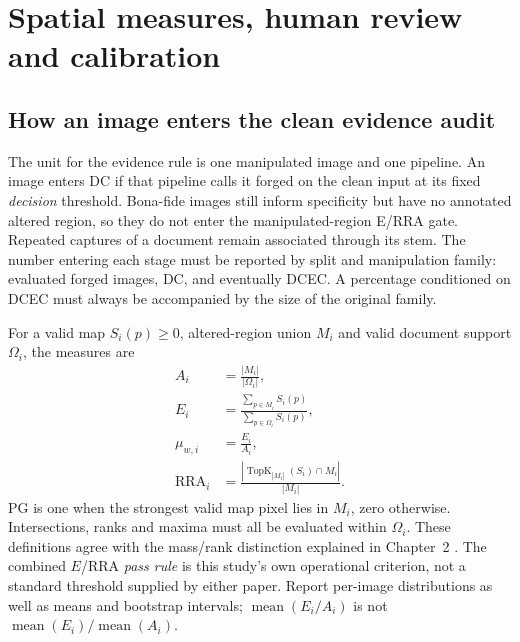 
\chapter{Spatial measures, human review and calibration}
\label{app:clean-metrics}

\section{How an image enters the clean evidence audit}
\label{app:clean-metrics-entry}

The unit for the evidence rule is one manipulated image and one pipeline. An image enters DC if that pipeline calls it forged on the clean input at its fixed \emph{decision} threshold. Bona-fide images still inform specificity but have no annotated altered region, so they do not enter the manipulated-region E/RRA gate. Repeated captures of a document remain associated through its stem. The number entering each stage must be reported by split and manipulation family: evaluated forged images, DC, and eventually DCEC. A percentage conditioned on DCEC must always be accompanied by the size of the original family.

For a valid map $S_i(p)\geq0$, altered-region union $M_i$ and valid document support $\Omega_i$, the measures are
\begin{equation}
\begin{aligned}
A_i&=\frac{|M_i|}{|\Omega_i|},\\
E_i&=\frac{\sum_{p\in M_i}S_i(p)}{\sum_{p\in\Omega_i}S_i(p)},\\
\mu_{w,i}&=\frac{E_i}{A_i},\\
\mathrm{RRA}_i&=\frac{|\operatorname{TopK}_{|M_i|}(S_i)\cap M_i|}{|M_i|}.
\end{aligned}
\label{eq:app-clean-measures}
\end{equation}
PG is one when the strongest valid map pixel lies in $M_i$, zero otherwise. Intersections, ranks and maxima must all be evaluated within $\Omega_i$. These definitions agree with the mass/rank distinction explained in Chapter~2 \citep{arras2022clevrxai,wang2020scorecam}. The combined $E$/RRA \emph{pass rule} is this study's own operational criterion, not a standard threshold supplied by either paper. Report per-image distributions as well as means and bootstrap intervals; $\operatorname{mean}(E_i/A_i)$ is not $\operatorname{mean}(E_i)/\operatorname{mean}(A_i)$.

